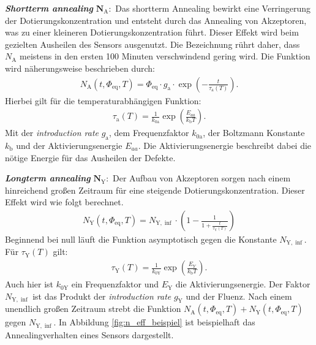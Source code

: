 \textbf{\textit{Shortterm annealing}} $\symbf{N_{\mathrm{A}}}:$ Das shortterm Annealing bewirkt eine Verringerung der Dotierungskonzentration und entsteht durch
das Annealing von Akzeptoren, was zu einer kleineren Dotierungskonzentration führt. Dieser Effekt wird beim
gezielten Ausheilen des Sensors ausgenutzt. Die Bezeichnung rührt daher, dass $N_{\mathrm{A}}$ meistens in den ersten 100 Minuten verschwindend gering wird. Die
Funktion wird näherungsweise beschrieben durch:
\begin{align}
  N_{\mathrm{A}}(t, \Phi_{\mathrm{eq}}, T) = \Phi_{\mathrm{eq}} \cdot g_{\mathrm{a}} \cdot \exp{\left(-\frac{t}{\tau_{\mathrm{a}}(T)}\right)}.
\end{align}
Hierbei gilt für die temperaturabhängigen Funktion:
\begin{align}
  \tau_{\mathrm{a}}(T) = \frac{1}{k_{0\mathrm{a}}}\exp{\left(\frac{E_{aa}}{k_{\mathrm{b}}T}\right)}.
\end{align}
Mit der \textit{introduction rate} $g_{\mathrm{a}}$, dem Frequenzfaktor $k_{0\mathrm{a}}$, der Boltzmann Konstante $k_{\mathrm{b}}$ und
der Aktivierungsenergie $E_{aa}$. Die Aktivierungsenergie beschreibt dabei die nötige Energie für das Ausheilen der Defekte.


\textbf{\textit{Longterm annealing}} $\symbf{N_{\mathrm{Y}}}:$ Der Aufbau von
Akzeptoren sorgen nach einem hinreichend großen Zeitraum für eine steigende
Dotierungskonzentration. Dieser Effekt wird wie folgt berechnet.
\begin{align}
  N_{\mathrm{Y}}(t, \Phi_{\mathrm{eq}}, T)     = N_{\mathrm{Y , \inf}}\cdot \left(1 - \frac{1}{1 + \frac{t}{\tau_{\mathrm{Y}}(T)}}\right)
\end{align}
Beginnend bei null läuft die Funktion asymptotisch gegen die Konstante $N_{\mathrm{Y, \inf}}$.
Für $\tau_{\mathrm{Y}}(T)$ gilt:
\begin{align}
  \tau_{\mathrm{Y}}(T) = \frac{1}{k_{0\mathrm{Y}}}\exp{\left(\frac{E_{Y}}{k_{\mathrm{b}}T}\right)}.
\end{align}
Auch hier ist $k_{0\mathrm{Y}}$ ein Frequenzfaktor und $E_{\mathrm{Y}}$ die Aktivierungsenergie. Der Faktor $N_{\mathrm{Y , \inf}}$
ist das Produkt der \textit{introduction rate} $g_{\mathrm{Y}}$ und der Fluenz. Nach einem unendlich großen Zeitraum strebt
die Funktion $N_{\mathrm{A}}(t, \Phi_{\mathrm{eq}}, T) + N_{\mathrm{Y}}(t, \Phi_{\mathrm{eq}}, T)$ gegen $N_{\mathrm{Y , \inf}}$.
In Abbildung \ref{fig:n_eff_beispiel} ist beispielhaft das Annealingverhalten eines
Sensors dargestellt.

